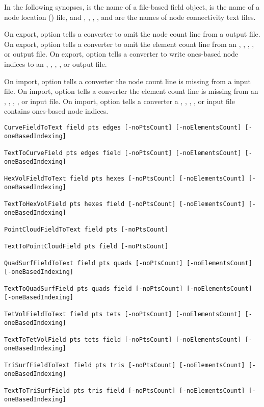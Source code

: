 In the following synopses,  is the name of a \sr{}
file-based field object,  is the name of a node location
() file, and , ,
, , and  are the names of node
connectivity text files.

On export, option  tells a converter to omit the
node count line from a  output file.  On export, option
 tells a converter to omit the element count
line from an , , ,
, or  output file.  On export, option
 tells a converter to write ones-based node
indices to an , , ,
, or  output file.

On import, option  tells a converter the node
count line is missing from a  input file.  On import,
option  tells a converter the element count
line is missing from an , ,
, , or  input file.  On
import, option  tells a converter a
, , , , or
 input file contains ones-based node indices.

\begin{verbatim}
CurveFieldToText field pts edges [-noPtsCount] [-noElementsCount] [-oneBasedIndexing]

TextToCurveField pts edges field [-noPtsCount] [-noElementsCount] [-oneBasedIndexing]

HexVolFieldToText field pts hexes [-noPtsCount] [-noElementsCount] [-oneBasedIndexing]

TextToHexVolField pts hexes field [-noPtsCount] [-noElementsCount] [-oneBasedIndexing]

PointCloudFieldToText field pts [-noPtsCount]

TextToPointCloudField pts field [-noPtsCount]

QuadSurfFieldToText field pts quads [-noPtsCount] [-noElementsCount] [-oneBasedIndexing]

TextToQuadSurfField pts quads field [-noPtsCount] [-noElementsCount] [-oneBasedIndexing]

TetVolFieldToText field pts tets [-noPtsCount] [-noElementsCount] [-oneBasedIndexing]

TextToTetVolField pts tets field [-noPtsCount] [-noElementsCount] [-oneBasedIndexing]

TriSurfFieldToText field pts tris [-noPtsCount] [-noElementsCount] [-oneBasedIndexing]

TextToTriSurfField pts tris field [-noPtsCount] [-noElementsCount] [-oneBasedIndexing]
\end{verbatim}


